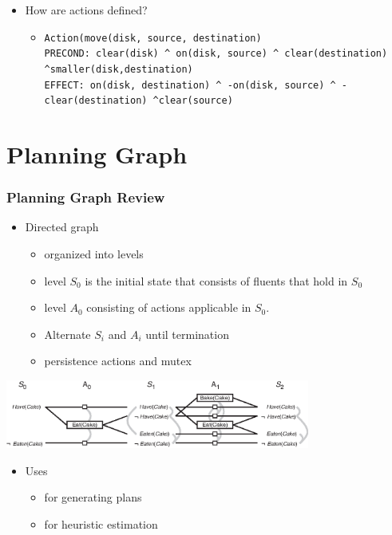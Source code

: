 \documentclass[compress, 9pt]{beamer}
\begin{document}
\begin{frame}
\begin{itemize}
\item <7-> How are actions defined?
\begin{itemize}
\item <8-> \texttt{Action(move(disk, source, destination)}\\
\texttt{PRECOND: clear(disk) \textasciicircum{} on(disk, source) \textasciicircum{} clear(destination)     \textasciicircum{}smaller(disk,destination)}\\
             \texttt{EFFECT: on(disk, destination) \textasciicircum{} -on(disk, source) \textasciicircum{} -clear(destination) \textasciicircum{}clear(source)}
\end{itemize}
\end{itemize}
\end{frame}
\section{Planning Graph}
\label{sec-3}
\begin{frame}
\frametitle{Planning Graph Review}
\label{sec-3-1}
\begin{itemize}

\item <1-> Directed graph
\label{sec-3-1-1}%
\begin{itemize}
\item <1-> organized into levels
\item <1-> level $S_0$ is the initial state that consists of fluents that hold
  in $S_0$
\item <1-> level $A_0$ consisting of actions applicable in $S_0$.
\item <1-> Alternate $S_i$ and $A_i$ until termination
\item <1-> persistence actions and mutex
\end{itemize}
\end{itemize} %
\label{sec-3-1-2}

\includegraphics[width=10cm]{../images/eatcake-graphplan2.eps}
\begin{itemize}

\item Uses
\label{sec-3-1-3}%
\begin{itemize}
\item for generating plans
\item for heuristic estimation
\end{itemize}
\end{itemize} %
\end{frame}
\end{document}
